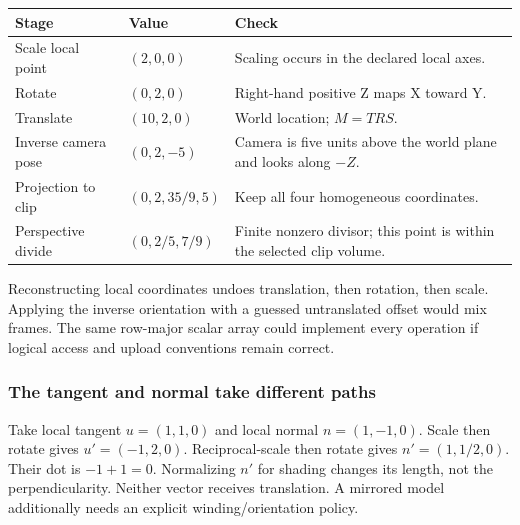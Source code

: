 {\def\LTcaptype{none} %
\begin{longtable}[]{@{}
  >{\raggedright\arraybackslash}p{}
  >{\raggedright\arraybackslash}p{}
  >{\raggedright\arraybackslash}p{}@{}}
\toprule\noalign{}
\begin{minipage}[b]{\linewidth}\raggedright
Stage
\end{minipage} & \begin{minipage}[b]{\linewidth}\raggedright
Value
\end{minipage} & \begin{minipage}[b]{\linewidth}\raggedright
Check
\end{minipage} \\
\midrule\noalign{}
\endhead
\bottomrule\noalign{}
\endlastfoot
Scale local point & \((2,0,0)\) & Scaling occurs in the declared local axes. \\
Rotate & \((0,2,0)\) & Right-hand positive Z maps X toward Y. \\
Translate & \((10,2,0)\) & World location; \(M=TRS\). \\
Inverse camera pose & \((0,2,-5)\) & Camera is five units above the world plane and looks along \(-Z\). \\
Projection to clip & \((0,2,35/9,5)\) & Keep all four homogeneous coordinates. \\
Perspective divide & \((0,2/5,7/9)\) & Finite nonzero divisor; this point is within the selected clip volume. \\
\end{longtable}
}

Reconstructing local coordinates undoes translation, then rotation, then scale. Applying the inverse orientation with a guessed untranslated offset would mix frames. The same row-major scalar array could implement every operation if logical access and upload conventions remain correct.

\subsubsection{The tangent and normal take different paths}\label{appendix-92ff77d4dfdc-the-tangent-and-normal-take-different-paths}

\hypertarget{appendix-92ff77d4dfdc-the-tangent-and-normal-take-different-paths}{}

Take local tangent \(u=(1,1,0)\) and local normal \(n=(1,-1,0)\). Scale then rotate gives \(u'=(-1,2,0)\). Reciprocal-scale then rotate gives \(n'=(1,1/2,0)\). Their dot is \(-1+1=0\). Normalizing \(n'\) for shading changes its length, not the perpendicularity. Neither vector receives translation. A mirrored model additionally needs an explicit winding/orientation policy.

